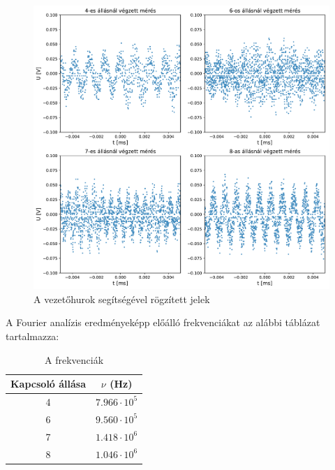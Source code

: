 \documentclass[12pt,a4paper]{article}
\begin{document}
\begin{figure}[!h]
\centering
\includegraphics[scale=0.55]{frekik}
\caption{A vezetőhurok segítségével rögzített jelek}
\label{fig:frek}
\end{figure}

A Fourier analízis eredményeképp előálló frekvenciákat az alábbi táblázat tartalmazza:\\

\begin{table}[h!]
\begin{center}
\begin{tabular}{| c || c |}
\hline
Kapcsoló állása &  $\nu$ (Hz) \\ \hline
4 & $7.966\cdot 10^{5}$ \\ \hline
6 & $9.560\cdot 10^{5}$ \\ \hline
7 & $1.418\cdot 10^{6}$ \\ \hline
8 & $1.046\cdot 10^{6}$ \\ \hline
\end{tabular}
\caption{A frekvenciák}
\end{center}
\end{table}
\newpage
\end{document}
